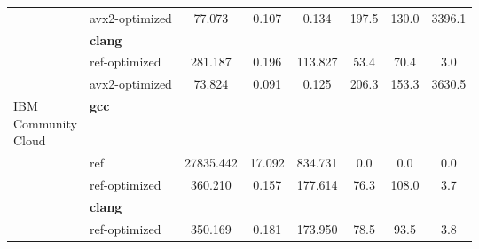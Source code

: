 \begin{table}[H]
\begin{tabularx}{\linewidth}{l l c c c c c c}
          & avx2-optimized & 77.073 & 0.107 & 0.134 & 197.5 & 130.0 & 3396.1\\
          & \textbf{clang} & & & & & \\
          & ref-optimized & 281.187 & 0.196 & 113.827 & 53.4 & 70.4 & 3.0\\
          & avx2-optimized & 73.824 & 0.091 & 0.125 & 206.3 & 153.3 & 3630.5\\
          \midrule
          \multirowcell{5}{IBM\\ Community\\ Cloud}
          & \textbf{gcc} & & & & & \\
          & ref & 27835.442 & 17.092 & 834.731 & 0.0 & 0.0 & 0.0\\
          & ref-optimized & 360.210 & 0.157 & 177.614 & 76.3 & 108.0 & 3.7\\
          & \textbf{clang} & & & & & \\
          & ref-optimized & 350.169 & 0.181 & 173.950 & 78.5 & 93.5 & 3.8\\
        \bottomrule
    \end{tabularx}
\end{table}